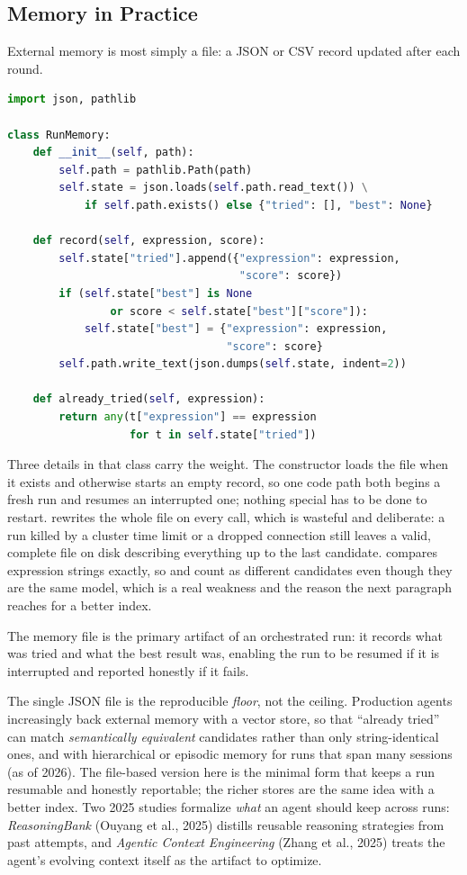 \subsection{Memory in Practice}

External memory is most simply a file: a JSON or CSV record updated after each round.

\begin{lstlisting}[language=python]
import json, pathlib

class RunMemory:
    def __init__(self, path):
        self.path = pathlib.Path(path)
        self.state = json.loads(self.path.read_text()) \
            if self.path.exists() else {"tried": [], "best": None}

    def record(self, expression, score):
        self.state["tried"].append({"expression": expression,
                                    "score": score})
        if (self.state["best"] is None
                or score < self.state["best"]["score"]):
            self.state["best"] = {"expression": expression,
                                  "score": score}
        self.path.write_text(json.dumps(self.state, indent=2))

    def already_tried(self, expression):
        return any(t["expression"] == expression
                   for t in self.state["tried"])
\end{lstlisting}
Three details in that class carry the weight.
The constructor loads the file when it exists and otherwise starts an empty record, so one code path both begins a fresh run and resumes an interrupted one; nothing special has to be done to restart.
\code{record} rewrites the whole file on every call, which is wasteful and deliberate: a run killed by a cluster time limit or a dropped connection still leaves a valid, complete file on disk describing everything up to the last candidate.
\code{already\_tried} compares expression strings exactly, so \code{x0*x1} and \code{x1*x0} count as different candidates even though they are the same model, which is a real weakness and the reason the next paragraph reaches for a better index.

The memory file is the primary artifact of an orchestrated run: it records what was tried and what the best result was, enabling the run to be resumed if it is interrupted and reported honestly if it fails.

The single JSON file is the reproducible \emph{floor}, not the ceiling.
Production agents increasingly back external memory with a vector store, so that ``already tried'' can match \emph{semantically equivalent} candidates rather than only string-identical ones, and with hierarchical or episodic memory for runs that span many sessions (as of 2026).
The file-based version here is the minimal form that keeps a run resumable and honestly reportable; the richer stores are the same idea with a better index.
Two 2025 studies formalize \emph{what} an agent should keep across runs: \emph{ReasoningBank} (Ouyang et al., 2025) distills reusable reasoning strategies from past attempts, and \emph{Agentic Context Engineering} (Zhang et al., 2025) treats the agent's evolving context itself as the artifact to optimize.

